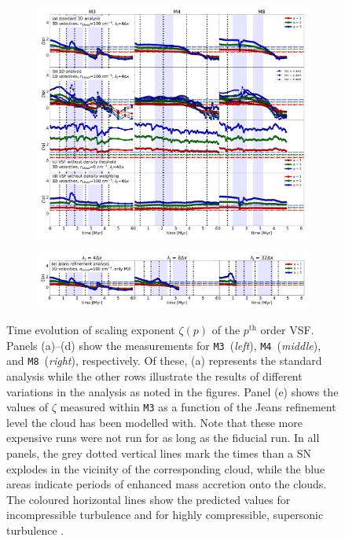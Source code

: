 \begin{figure}[!htb]
	\centering  
  
  \begin{subfigure}[c]{\textwidth}
      \includegraphics[width=\textwidth]{zeta_all_nojeans.pdf}
      \label{pic:results:zeta_all_nojeans}
  \end{subfigure}
  \begin{subfigure}[c]{\textwidth}
      \addtocounter{subfigure}{4}
      \includegraphics[width=\textwidth]{zeta_jeans.pdf}
      \label{pic:results:zeta_all_jeans}
  \end{subfigure}
  
  \caption{Time evolution of scaling exponent $\zeta(p)$ of the $p^\mathrm{th}$ order VSF. Panels (a)--(d) show the measurements for \texttt{M3}~(\textit{left}), \texttt{M4}~(\textit{middle}), and \texttt{M8}~(\textit{right}), respectively. Of these, (a) represents the standard analysis while the other rows illustrate the results of different variations in the analysis as noted in the figures. Panel (e) shows the values of $\zeta$ measured within \texttt{M3} as a function of the Jeans refinement level the cloud has been modelled with. Note that these more expensive runs were not run for as long as the fiducial run.  In all panels, the grey dotted vertical lines mark the times than a SN explodes in the vicinity of the corresponding cloud, while the blue areas indicate periods of enhanced mass accretion onto the clouds. The coloured horizontal lines show the predicted values for incompressible turbulence \citep[dash-dotted lines;][]{She1994} and for highly compressible, supersonic turbulence \citep[dashed lines;][]{Boldyrev2002}.}
	\label{pic:results:zeta_all}
\end{figure}

